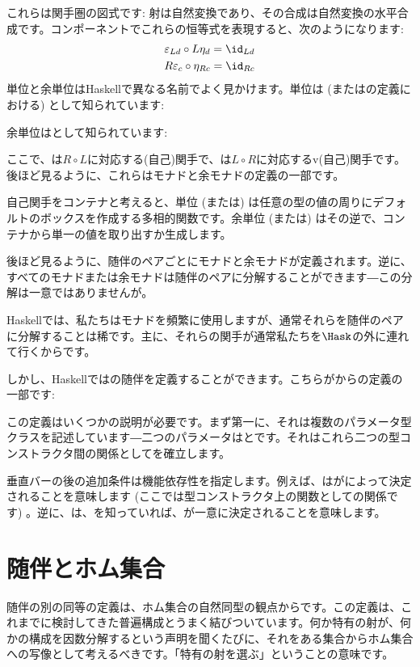 \noindent
これらは関手圏の図式です: 射は自然変換であり、その合成は自然変換の水平合成です。コンポーネントでこれらの恒等式を表現すると、次のようになります: 
\begin{gather*}
  \varepsilon_{L d} \circ L \eta_d = \id_{L d} \\
  R \varepsilon_{c} \circ \eta_{R c} = \id_{R c}
\end{gather*}
単位と余単位はHaskellで異なる名前でよく見かけます。単位は (またはの定義における) として知られています: 

余単位はとして知られています: 

ここで、は$R \circ L$に対応する(自己)関手で、は$L \circ R$に対応するv(自己)関手です。後ほど見るように、これらはモナドと余モナドの定義の一部です。

自己関手をコンテナと考えると、単位 (または) は任意の型の値の周りにデフォルトのボックスを作成する多相的関数です。余単位 (または) はその逆で、コンテナから単一の値を取り出すか生成します。

後ほど見るように、随伴のペアごとにモナドと余モナドが定義されます。逆に、すべてのモナドまたは余モナドは随伴のペアに分解することができます―この分解は一意ではありませんが。

Haskellでは、私たちはモナドを頻繁に使用しますが、通常それらを随伴のペアに分解することは稀です。主に、それらの関手が通常私たちを$\Hask$の外に連れて行くからです。

しかし、Haskellではの随伴を定義することができます。こちらがからの定義の一部です: 

この定義はいくつかの説明が必要です。まず第一に、それは複数のパラメータ型クラスを記述しています―二つのパラメータはとです。それはこれら二つの型コンストラクタ間の関係としてを確立します。

垂直バーの後の追加条件は機能依存性を指定します。例えば、はがによって決定されることを意味します (ここでは型コンストラクタ上の関数としての関係です) 。逆に、は、を知っていれば、が一意に決定されることを意味します。

\section{随伴とホム集合}

随伴の別の同等の定義は、ホム集合の自然同型の観点からです。この定義は、これまでに検討してきた普遍構成とうまく結びついています。何か特有の射が、何かの構成を因数分解するという声明を聞くたびに、それをある集合からホム集合への写像として考えるべきです。「特有の射を選ぶ」ということの意味です。

